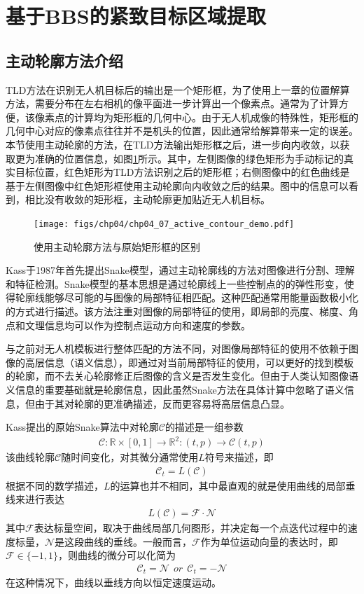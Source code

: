 \section{基于BBS的紧致目标区域提取}
\subsection{主动轮廓方法介绍}
TLD方法在识别无人机目标后的输出是一个矩形框，为了使用上一章的位置解算方法，需要分布在左右相机的像平面进一步计算出一个像素点。通常为了计算方便，该像素点的计算均为矩形框的几何中心。由于无人机成像的特殊性，矩形框的几何中心对应的像素点往往并不是机头的位置，因此通常给解算带来一定的误差。本节使用主动轮廓的方法，在TLD方法输出矩形框之后，进一步向内收敛，以获取更为准确的位置信息，如图\ref{fig:chp04_07_active_contour_demo}所示。其中，左侧图像的绿色矩形为手动标记的真实目标位置，红色矩形为TLD方法识别之后的矩形框；右侧图像中的红色曲线是基于左侧图像中红色矩形框使用主动轮廓向内收敛之后的结果。图中的信息可以看到，相比没有收敛的矩形框，主动轮廓更加贴近无人机目标。

\begin{figure}[ht]   
	\centering
	\texttt{[image: figs/chp04/chp04\_07\_active\_contour\_demo.pdf]}
	\caption{使用主动轮廓方法与原始矩形框的区别}
	\label{fig:chp04_07_active_contour_demo}
\end{figure}

Kass于1987年首先提出Snake模型\cite{kass1988snakes}，通过主动轮廓线的方法对图像进行分割、理解和特征检测。Snake模型的基本思想是通过轮廓线上一些控制点的的弹性形变，使得轮廓线能够尽可能的与图像的局部特征相匹配。这种匹配通常用能量函数极小化的方式进行描述。该方法注重对图像的局部特征的使用，即局部的亮度、梯度、角点和文理信息均可以作为控制点运动方向和速度的参数。

与之前对无人机模板进行整体匹配的方法不同，对图像局部特征的使用不依赖于图像的高层信息（语义信息），即通过对当前局部特征的使用，可以更好的找到模板的轮廓，而不去关心轮廓修正后图像的含义是否发生变化。但由于人类认知图像语义信息的重要基础就是轮廓信息，因此虽然Snake方法在具体计算中忽略了语义信息，但由于其对轮廓的更准确描述，反而更容易将高层信息凸显。

Kass提出的原始Snake算法中对轮廓$\mathcal{C}$的描述是一组参数
\begin{align}
\mathcal{C}:\mathbb{R} \times [0,1] \rightarrow \mathbb{R}^2:(t,p) \rightarrow \mathcal{C}(t,p)
\end{align}
该曲线轮廓$\mathcal{C}$随时间变化，对其微分通常使用$L$符号来描述，即
\begin{align}
\mathcal{C}_t =L(\mathcal{C})
\end{align}
根据不同的数学描述，$L$的运算也并不相同，其中最直观的就是使用曲线的局部垂线来进行表达
\begin{align}
L(\mathcal{C}) = \mathcal{F} \cdot \mathcal{N}
\end{align}
其中$\mathcal{F}$表达标量空间，取决于曲线局部几何图形，并决定每一个点迭代过程中的速度标量，$\mathcal{N}$是这段曲线的垂线。一般而言，$\mathcal{F}$作为单位运动向量的表达时，即$\mathcal{F} \in \{-1, 1\}$，则曲线的微分可以化简为
\begin{align}
\mathcal{C}_t = \mathcal{N}\ \ or\  \ \mathcal{C}_t= -\mathcal{N}
\end{align}
在这种情况下，曲线以垂线方向以恒定速度运动。

